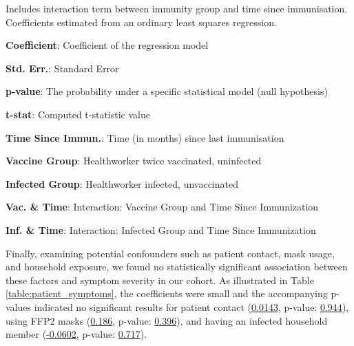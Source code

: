 \documentclass[11pt]{article}
\begin{document}
\begin{table}[h]
\begin{threeparttable}
\begin{tablenotes}
\footnotesize
\item Includes interaction term between immunity group and time since immunisation. Coefficients estimated from an ordinary least squares regression.
\item \textbf{Coefficient}: Coefficient of the regression model
\item \textbf{Std. Err.}: Standard Error
\item \textbf{p-value}: The probability under a specific statistical model (null hypothesis)
\item \textbf{t-stat}: Computed t-statistic value
\item \textbf{Time Since Immun.}: Time (in months) since last immunisation
\item \textbf{Vaccine Group}: Healthworker twice vaccinated, uninfected
\item \textbf{Infected Group}: Healthworker infected, unvaccinated
\item \textbf{Vac. \& Time}: Interaction: Vaccine Group and Time Since Immunization
\item \textbf{Inf. \& Time}: Interaction: Infected Group and Time Since Immunization
\end{tablenotes}
\end{threeparttable}
\end{table}

Finally, examining potential confounders such as patient contact, mask usage, and household exposure, we found no statistically significant association between these factors and symptom severity in our cohort. As illustrated in Table \ref{table:patient_symptoms}, the coefficients were small and the accompanying p-values indicated no significant results for patient contact (\hyperlink{C2a}{0.0143}, p-value: \hyperlink{C2d}{0.944}), using FFP2 masks (\hyperlink{C3a}{0.186}, p-value: \hyperlink{C3d}{0.396}), and having an infected household member (\hyperlink{C4a}{-0.0602}, p-value: \hyperlink{C4d}{0.717}).
\end{document}
